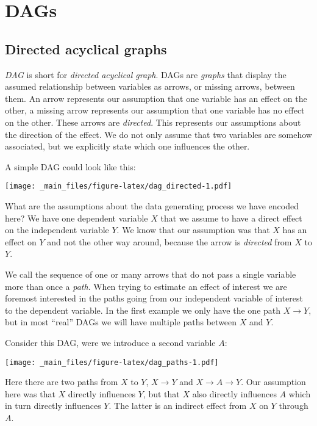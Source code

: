 \documentclass[
]{book}
\begin{document}
\hypertarget{dags}{%
\section{DAGs}\label{dags}}

\hypertarget{directed-acyclical-graphs}{%
\subsection{Directed acyclical graphs}\label{directed-acyclical-graphs}}

\emph{DAG} is short for \emph{directed acyclical graph}. DAGs are \emph{graphs} that display
the assumed relationship between variables as arrows, or missing arrows, between
them. An arrow represents our assumption that one variable has an effect on the
other, a missing arrow represents our assumption that one variable has no effect
on the other. These arrows are \emph{directed}. This represents our assumptions about
the direction of the effect. We do not only assume that two variables are
somehow associated, but we explicitly state which one influences the other.

A simple DAG could look like this:

\texttt{[image: \_main\_files/figure-latex/dag\_directed-1.pdf]}

What are the assumptions about the data generating process we have encoded here?
We have one dependent variable \(X\) that we assume to have a direct effect on the
independent variable \(Y\). We know that our assumption was that \(X\) has an effect
on \(Y\) and not the other way around, because the arrow is \emph{directed} from \(X\) to
\(Y\).

We call the sequence of one or many arrows that do not pass a single variable
more than once a \emph{path}. When trying to estimate an effect of interest we are
foremost interested in the paths going from our independent variable of interest
to the dependent variable.
In the first example we only have the one path \(X \rightarrow Y\), but in most
``real'' DAGs we will have multiple paths between \(X\) and \(Y\).

Consider this DAG, were we introduce a second variable \(A\):

\texttt{[image: \_main\_files/figure-latex/dag\_paths-1.pdf]}

Here there are two paths from \(X\) to \(Y\), \(X \rightarrow Y\) and
\(X \rightarrow A \rightarrow Y\). Our assumption here was that \(X\) directly
influences \(Y\), but that \(X\) also directly influences \(A\) which in turn directly
influences \(Y\). The latter is an indirect effect from \(X\) on \(Y\) through \(A\).
\end{document}
